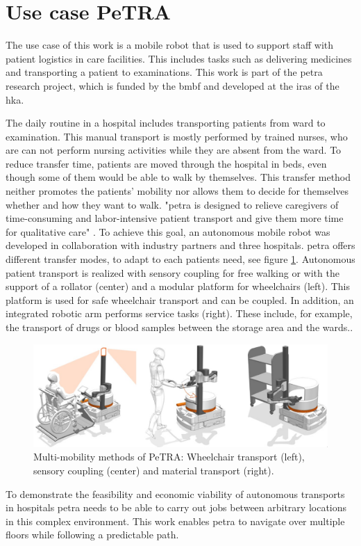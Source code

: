 \section{Use case PeTRA}
\label{sec:use_case}
The use case of this work is a mobile robot that is used to support staff with patient logistics in care facilities. This includes tasks such as delivering medicines and transporting a patient to examinations. This work is part of the \gls{petra} research project, which is funded by the \gls{bmbf} \cite{bmbf-internetredaktion_bekanntmachung_2018} and developed at the \gls{iras} of the \gls{hka}.

The daily routine in a hospital includes transporting patients from ward to examination. This manual transport is mostly performed by trained nurses, who are can not perform nursing activities while they are absent from the ward. To reduce transfer time, patients are moved through the hospital in beds, even though some of them would be able to walk by themselves. This transfer method neither promotes the patients' mobility nor allows them to decide for themselves whether and how they want to walk. "\Gls{petra} is designed to relieve caregivers of time-consuming and labor-intensive patient transport and give them more time for qualitative care" \cite{petra-konsortium_personen-transfer_2022}. To achieve this goal, an autonomous mobile robot was developed in collaboration with industry partners and three hospitals. \Gls{petra} offers different transfer modes, to adapt to each patients need, see figure  \ref{fig:multi_mobility_methods}. Autonomous patient transport is realized with sensory coupling for free walking or with the support of a rollator (center) and a modular platform for wheelchairs (left). This platform is used for safe wheelchair transport and can be coupled. In addition, an integrated robotic arm performs service tasks (right). These include, for example, the transport of drugs or blood samples between the storage area and the wards..

\begin{figure}[h]
\includegraphics[width=\textwidth]{figures/20_state_of_the_art/PeTRA_transport_modes.jpg}
\caption[]{Multi-mobility methods of PeTRA: Wheelchair transport (left), sensory coupling (center) and material transport (right).}
\centering
\label{fig:multi_mobility_methods}
\end{figure}
To demonstrate the feasibility and economic viability of autonomous transports in hospitals \gls{petra} needs to be able to carry out jobs between arbitrary locations in this complex environment. This work enables \gls{petra} to navigate over multiple floors while following a predictable path.


